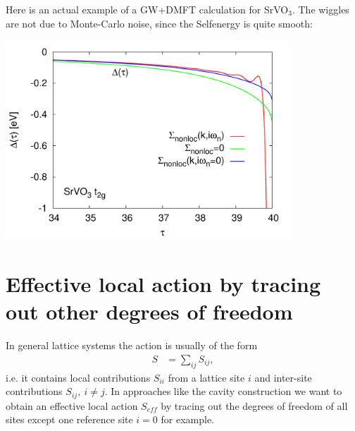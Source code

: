 \documentclass[12pt,a4paper]{scrartcl}
\numberwithin{equation}{section}
\begin{document}
Here is an actual example of a GW+DMFT calculation for SrVO$_3$. The wiggles are not due to Monte-Carlo noise,
since the Selfenergy is quite smooth:

\begin{center}
\includegraphics[width=0.8\textwidth]{figs/svo_noncausal/delta.pdf}\end{center}


% 
% 



\clearpage

\section{Effective local action by tracing out other degrees of freedom}
In general lattice systems the action is usually of the form
\begin{align}
 S 
 &= \sum_{ij} S_{ij},
\end{align}
i.e. it contains local contributions $S_{ii}$ from a lattice site $i$ and 
inter-site contributions $S_{ij},\ i\neq j$. In approaches like the cavity
construction we want to obtain an effective local action $S_{eff}$ by tracing
out the degrees of freedom of all sites except one reference site $i=0$ for example.
\end{document}
